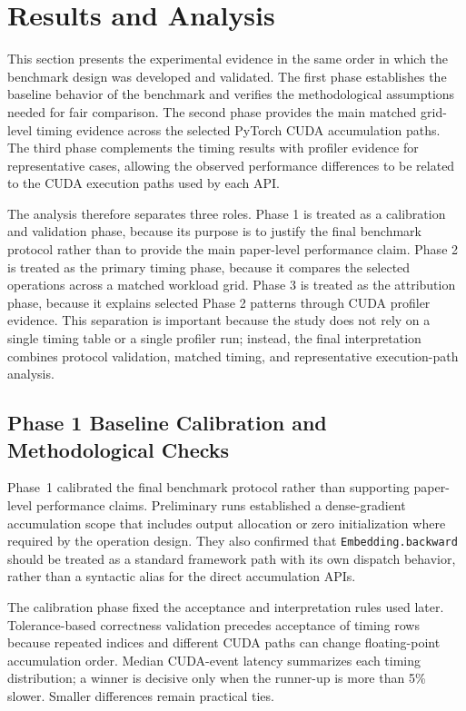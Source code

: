 \section{Results and Analysis}
\label{sec:results-analysis}

This section presents the experimental evidence in the same order in which the benchmark design was developed and validated. The first phase establishes the baseline behavior of the benchmark and verifies the methodological assumptions needed for fair comparison. The second phase provides the main matched grid-level timing evidence across the selected PyTorch CUDA accumulation paths. The third phase complements the timing results with profiler evidence for representative cases, allowing the observed performance differences to be related to the CUDA execution paths used by each API.

The analysis therefore separates three roles. Phase 1 is treated as a calibration and validation phase, because its purpose is to justify the final benchmark protocol rather than to provide the main paper-level performance claim. Phase 2 is treated as the primary timing phase, because it compares the selected operations across a matched workload grid. Phase 3 is treated as the attribution phase, because it explains selected Phase 2 patterns through CUDA profiler evidence. This separation is important because the study does not rely on a single timing table or a single profiler run; instead, the final interpretation combines protocol validation, matched timing, and representative execution-path analysis.

\subsection{Phase 1 Baseline Calibration and Methodological Checks}

Phase~1 calibrated the final benchmark protocol rather than supporting paper-level performance claims. Preliminary runs established a dense-gradient accumulation scope that includes output allocation or zero initialization where required by the operation design. They also confirmed that \texttt{Embedding.\allowbreak backward} should be treated as a standard framework path with its own dispatch behavior, rather than a syntactic alias for the direct accumulation APIs.

The calibration phase fixed the acceptance and interpretation rules used later. Tolerance-based correctness validation precedes acceptance of timing rows because repeated indices and different CUDA paths can change floating-point accumulation order. Median CUDA-event latency summarizes each timing distribution; a winner is decisive only when the runner-up is more than 5\% slower. Smaller differences remain practical ties.

